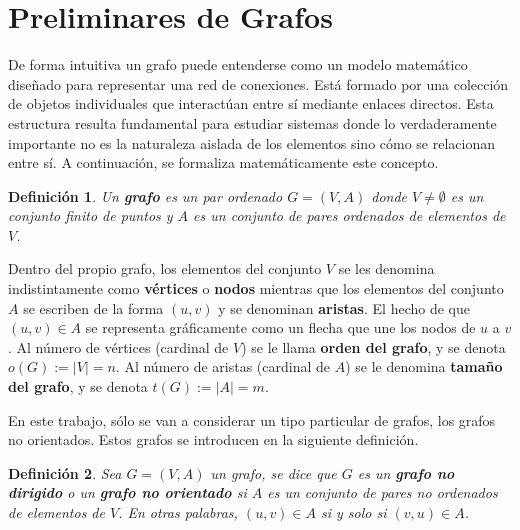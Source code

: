 \documentclass[11pt,a4paper,spanish]{report}
\theoremstyle{plain}
\newtheorem{definicion}{Definición}[chapter]
\begin{document}
\section{Preliminares de Grafos}
De forma intuitiva un grafo puede entenderse como un modelo matemático diseñado para representar una red de conexiones. Está formado por una colección de objetos individuales que interactúan entre sí mediante enlaces directos. Esta estructura resulta fundamental para estudiar sistemas donde lo verdaderamente importante no es la naturaleza aislada de los elementos sino cómo se relacionan entre sí. A continuación, se formaliza matemáticamente este concepto.

\begin{definicion}\cite{gross2018graph} Un \textbf{grafo} es un par ordenado \( G = (V,A) \) donde $V\neq \emptyset$ es un conjunto finito de puntos y $A$ es un
conjunto de pares ordenados de elementos de $V$. 
\end{definicion}

Dentro del propio grafo, los elementos del conjunto $V$ se les denomina indistintamente como \textbf{vértices} o \textbf{nodos} mientras que los elementos del conjunto $A$ se escriben de la forma $(u,v)$ y se denominan \textbf{aristas}. El hecho de que $(u,v)\in A$ se representa gráficamente como un flecha que une los nodos de $u$ a $v$. Al número de vértices (cardinal de $V$) se le llama \textbf{orden del grafo}, y se denota $o(G) := |V| = n$. Al número de aristas (cardinal de $A$) se le denomina \textbf{tamaño del grafo}, y se denota $t(G) := |A| = m$.

En este trabajo, sólo se van a considerar un tipo particular de grafos, los grafos no orientados. Estos grafos se introducen en la siguiente definición.

\begin{definicion}\cite{gross2018graph}
Sea \( G = (V,A) \) un grafo, se dice que $G$ es un \textbf{ grafo no dirigido} o un \textbf{grafo no orientado} si $A$ es un conjunto de pares no ordenados de elementos de \( V \). En otras palabras, $(u,v)\in A$ si y solo si $(v,u)\in A$.
\end{definicion}
\end{document}
